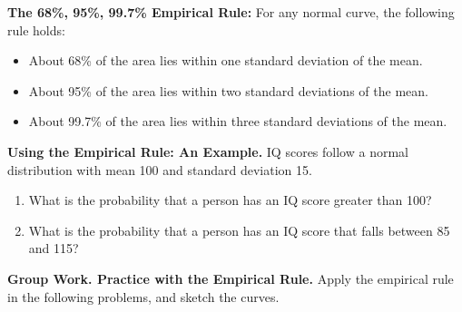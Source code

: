 \textbf{The 68\%, 95\%, 99.7\% Empirical Rule:} For any normal curve, the following rule holds:
\begin{itemize}
\item About 68\% of the area lies within one standard deviation of the mean.
\item About 95\% of the area lies within two standard deviations of the mean. 
\item About 99.7\% of the area lies within three standard deviations of the mean.
\end{itemize}

\textbf{Using the Empirical Rule: An Example.} IQ scores follow a normal distribution with mean 100 and standard deviation 15.
\begin{enumerate}
\item What is the probability that a person has an IQ score greater than 100?\\[.75in]
\item What is the probability that a person has an IQ score that falls between 85 and 115?\\[.75in]
\end{enumerate}
\newpage
\textbf{Group Work. Practice with the Empirical Rule.} Apply the empirical rule in the following problems, and sketch the curves. 
